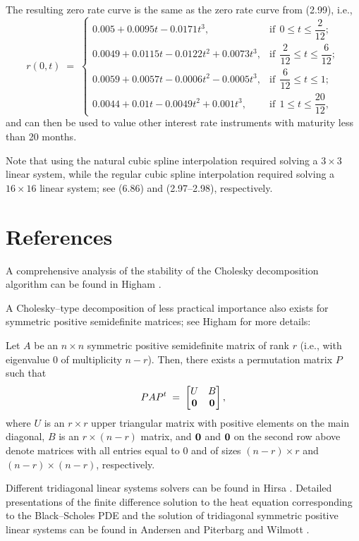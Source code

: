 The resulting zero rate curve is the same as the zero rate curve from (2.99), i.e.,
\[
r(0,t) \;=\;
\begin{cases}
0.005 + 0.0095t - 0.0171t^3, & \text{if} \ \ 0 \leq t \leq \dfrac{2}{12}; \\[6pt]
0.0049 + 0.0115t - 0.0122t^2 + 0.0073t^3, & \text{if} \ \ \dfrac{2}{12} \leq t \leq
\dfrac{6}{12}; \\[6pt]
0.0059 + 0.0057t - 0.0006t^2 - 0.0005t^3, & \text{if} \ \ \dfrac{6}{12} \leq t \leq 1; \\[6pt]
0.0044 + 0.01t - 0.0049t^2 + 0.001t^3, & \text{if} \ \ 1 \leq t \leq \dfrac{20}{12},
\end{cases}
\]
and can then be used to value other interest rate instruments with maturity less than
20 months.

Note that using the natural cubic spline interpolation required solving a $3 \times 3$
linear system, while the regular cubic spline interpolation required solving a
$16 \times 16$ linear system; see (6.86) and (2.97--2.98), respectively.

\section{References}

A comprehensive analysis of the stability of the Cholesky decomposition algorithm can
be found in Higham \cite{20}.

A Cholesky--type decomposition of less practical importance also exists for symmetric
positive semidefinite matrices; see Higham \cite{19} for more details:

Let $A$ be an $n \times n$ symmetric positive semidefinite matrix of rank $r$ (i.e.,
with eigenvalue 0 of multiplicity $n - r$). Then, there exists a permutation matrix $P$
such that
\[
PAP^{t} \;=\; \begin{bmatrix} U & B \\ \mathbf{0} & \mathbf{0} \end{bmatrix},
\]
where $U$ is an $r \times r$ upper triangular matrix with positive elements on the main
diagonal, $B$ is an $r \times (n-r)$ matrix, and $\mathbf{0}$ and $\mathbf{0}$ on the second
row above denote matrices with all entries equal to 0 and of sizes $(n-r) \times r$ and
$(n-r) \times (n-r)$, respectively.

Different tridiagonal linear systems solvers can be found in Hirsa \cite{21}. Detailed
presentations of the finite difference solution to the heat equation corresponding to
the Black--Scholes PDE and the solution of tridiagonal symmetric positive linear
systems can be found in Andersen and Piterbarg \cite{3} and Wilmott \cite{45}.


